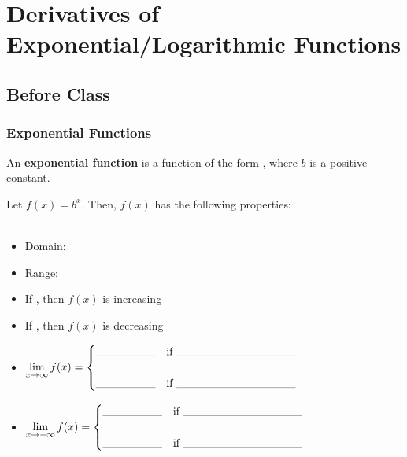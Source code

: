 \documentclass[notes]{subfiles}
\begin{document}
	\fancyhead[LO,RE]{\bfseries \small \currentname}
	\fancyfoot[C]{{}}
	\fancyfoot[RO,LE]{\large \thepage}	%
	
\section*{Derivatives of Exponential/Logarithmic Functions}\label{cs39}
	\subsection*{Before Class}
	\subsubsection*{Exponential Functions}
		\begin{defn}
			An \textbf{exponential function} is a function of the form , where \(b\) is a positive constant.
		\end{defn}
		
		\begin{rmk}
			Let \(f(x) = b^x\).  Then, \(f(x)\) has the following properties:\\ \\
			\begin{itemize}
				\setlength\itemsep{25pt}
				\item Domain: 
				\item Range: 
				\item If , then \(f(x)\) is increasing
				\item If , then \(f(x)\) is decreasing
				\item \(\ds\lim_{x\to \infty} f(x) = \begin{cases}\blank{.75}& \text{if } \blank{1.5}\\ & \\ \blank{.75}& \text{if } \blank{1.5} \end{cases}\)
				\item \(\ds\lim_{x\to -\infty} f(x) =\begin{cases}\blank{.75}& \text{if } \blank{1.5}\\ & \\ \blank{.75}& \text{if } \blank{1.5} \end{cases}\) 	
			\end{itemize}
		\end{rmk}
			\newpage
			
\end{document}
